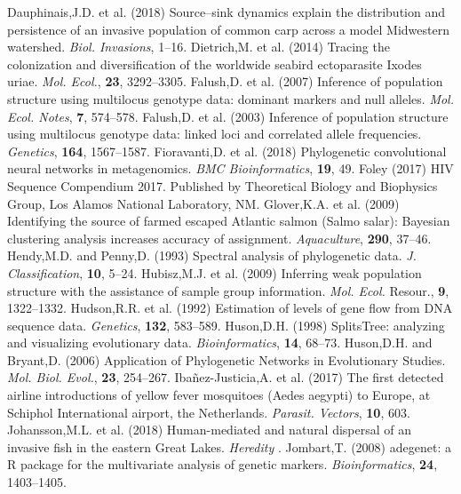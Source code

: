 \documentclass{bioinfo}
\begin{document}
\begin{thebibliography}{}
\bibitem[a ()]{}Dauphinais,J.D. et al. (2018) Source–sink dynamics explain the distribution and persistence of an invasive population of common carp across a model Midwestern watershed. \textit{Biol. Invasions}, 1–16.
\bibitem[a ()]{}Dietrich,M. et al. (2014) Tracing the colonization and diversification of the worldwide seabird ectoparasite Ixodes uriae. \textit{Mol. Ecol.}, \textbf{23}, 3292–3305.
\bibitem[a ()]{}Falush,D. et al. (2007) Inference of population structure using multilocus genotype data: dominant markers and null alleles. \textit{Mol. Ecol. Notes}, \textbf{7}, 574–578.
\bibitem[a ()]{}Falush,D. et al. (2003) Inference of population structure using multilocus genotype data: linked loci and correlated allele frequencies. \textit{Genetics}, \textbf{164}, 1567–1587.
\bibitem[a ()]{}Fioravanti,D. et al. (2018) Phylogenetic convolutional neural networks in metagenomics. \textit{BMC Bioinformatics}, \textbf{19}, 49.
\bibitem[a ()]{}Foley (2017) HIV Sequence Compendium 2017. Published by Theoretical Biology and Biophysics Group, Los Alamos National Laboratory, NM.
\bibitem[a ()]{}Glover,K.A. et al. (2009) Identifying the source of farmed escaped Atlantic salmon (Salmo salar): Bayesian clustering analysis increases accuracy of assignment. \textit{Aquaculture}, \textbf{290}, 37–46.
\bibitem[a ()]{}Hendy,M.D. and Penny,D. (1993) Spectral analysis of phylogenetic data. \textit{J. Classification}, \textbf{10}, 5–24.
\bibitem[a ()]{}Hubisz,M.J. et al. (2009) Inferring weak population structure with the assistance of sample group information. \textit{Mol. Ecol.} Resour., \textbf{9}, 1322–1332.
\bibitem[a ()]{}Hudson,R.R. et al. (1992) Estimation of levels of gene flow from DNA sequence data. \textit{Genetics}, \textbf{132}, 583–589.
\bibitem[a ()]{}Huson,D.H. (1998) SplitsTree: analyzing and visualizing evolutionary data. \textit{Bioinformatics}, \textbf{14}, 68–73.
\bibitem[a ()]{}Huson,D.H. and Bryant,D. (2006) Application of Phylogenetic Networks in Evolutionary Studies. \textit{Mol. Biol. Evol.}, \textbf{23}, 254–267.
\bibitem[a ()]{}Ibañez-Justicia,A. et al. (2017) The first detected airline introductions of yellow fever mosquitoes (Aedes aegypti) to Europe, at Schiphol International airport, the Netherlands. \textit{Parasit. Vectors}, \textbf{10}, 603.
\bibitem[a ()]{}Johansson,M.L. et al. (2018) Human-mediated and natural dispersal of an invasive fish in the eastern Great Lakes. \textit{Heredity }.
\bibitem[a ()]{}Jombart,T. (2008) adegenet: a R package for the multivariate analysis of genetic markers. \textit{Bioinformatics}, \textbf{24}, 1403–1405.

\end{thebibliography}
\end{document}
